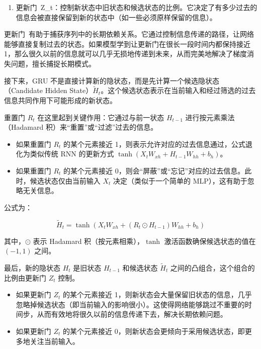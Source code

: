 \begin{enumerate}
\def\labelenumi{\arabic{enumi}.}
\setcounter{enumi}{1}
\tightlist
\item
  更新门~Z\_t：控制新状态中旧状态和候选状态的比例。它决定了有多少过去的信息会被直接保留到新的状态中（如一些必须原样保留的信息）。
\end{enumerate}

更新门~有助于捕获序列中的长期依赖关系。它通过控制信息传递的路径，让网络能够直接复制过去的状态。如果模型学到让更新门在很长一段时间内都保持接近1，那么很久以前的信息就可以几乎无损地传递到未来，从而完美地解决了梯度消失问题，擅长捕捉长期模式。

接下来，GRU 不是直接计算新的隐状态，而是先计算一个候选隐状态（Candidate Hidden State）\(\tilde{H}_t\)。这个候选状态表示在当前输入和经过筛选的过去信息共同作用下可能形成的新状态。

重置门 \(R_t\) 在这里起到关键作用：它通过与前一状态 \(H_{t-1}\) 进行按元素乘法（Hadamard 积）来``重置''或``过滤''过去的信息。

\begin{itemize}
\tightlist
\item
  如果重置门 \(R_t\) 的某个元素接近 1，则表示允许对应的过去信息通过，公式退化为类似传统 RNN 的更新方式 \(\tanh(X_t W_{xh} + H_{t-1}W_{hh} + b_h)\)。
\item
  如果重置门 \(R_t\) 的某个元素接近 0，则会``屏蔽''或``忘记''对应的过去信息。此时，候选状态仅由当前输入 \(X_t\) 决定（类似于一个简单的 MLP），这有助于忽略无关信息。
\end{itemize}

公式为：

\[
\tilde{H}_t = \tanh(X_t W_{xh} + (R_t \odot H_{t-1})W_{hh} + b_h)
\]

其中，\(\odot\) 表示 Hadamard 积（按元素相乘），\(\tanh\) 激活函数确保候选状态的值在 \((-1, 1)\) 之间。

最后，新的隐状态 \(H_t\) 是旧状态 \(H_{t-1}\) 和候选状态 \(\tilde{H}_t\) 之间的凸组合，这个组合的比例由更新门 \(Z_t\) 控制。

\begin{itemize}
\tightlist
\item
  如果更新门 \(Z_t\) 的某个元素接近 1，则新状态会大量保留旧状态的信息，几乎忽略掉候选状态（即当前输入的影响很小）。这使得网络能够跳过不重要的时间步，从而有效地将很久以前的信息传递下去，解决长期依赖问题。
\item
  如果更新门 \(Z_t\) 的某个元素接近 0，则新状态会更倾向于采用候选状态，即更多地关注当前输入。
\end{itemize}


